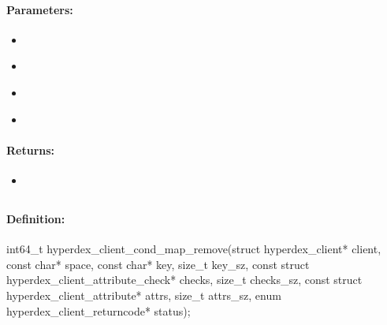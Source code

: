 \paragraph{Parameters:}
\begin{itemize}[noitemsep]
\item {}\\

\item {}\\

\item {}\\

\item {}\\

\end{itemize}

\paragraph{Returns:}
\begin{itemize}[noitemsep]
\item {}\\

\end{itemize}

\pagebreak
\subsection{}
\label{api:c:cond_map_remove}


\paragraph{Definition:}
\begin{ccode}
int64_t hyperdex_client_cond_map_remove(struct hyperdex_client* client,
        const char* space,
        const char* key, size_t key_sz,
        const struct hyperdex_client_attribute_check* checks, size_t checks_sz,
        const struct hyperdex_client_attribute* attrs, size_t attrs_sz,
        enum hyperdex_client_returncode* status);
\end{ccode}

